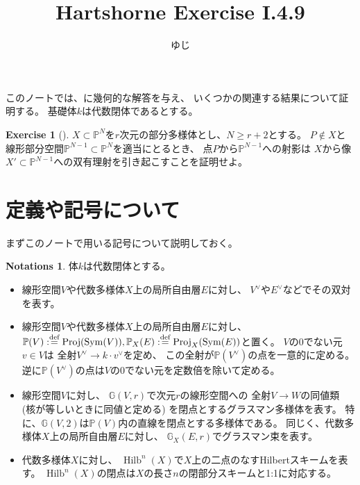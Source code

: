 \documentclass[uplatex]{jsarticle}
\title{Hartshorne Exercise I.4.9}
\author{ゆじ}
\theoremstyle{definition}
\newtheorem*{notation*}{Notations}
\newtheorem*{Ex*}{Exercise}
\DeclareMathOperator{\Proj}{\mathrm{Proj}}
\DeclareMathOperator{\Sym}{\mathrm{Sym}}
\DeclareMathOperator{\Hilb}{\mathrm{Hilb}}
\newcommand{\G}{\mathbb{G}}
\renewcommand{\P}{\mathbb{P}}
\def\dfn{:\overset{\mbox{{\scriptsize def}}}{=}}
\begin{document}
\maketitle


このノートでは、\cite[演習 I.4.9]{Ha}に幾何的な解答を与え、
いくつかの関連する結果について証明する。
基礎体\(k\)は代数閉体であるとする。


\begin{Ex*}[{\cite[演習 I.4.9]{Ha}}]
  \(X\subset \P^N\)を\(r\)次元の部分多様体とし、\(N\geq r+2\)とする。
  \(P\not\in X\)と線形部分空間\(\P^{N-1}\subset \P^N\)を適当にとるとき、
  点\(P\)から\(\P^{N-1}\)への射影は
  \(X\)から像\(X'\subset \P^{N-1}\)への双有理射を引き起こすことを証明せよ。
\end{Ex*}


\section{定義や記号について}



まずこのノートで用いる記号について説明しておく。

\begin{notation*}
  体\(k\)は代数閉体とする。
  \begin{itemize}
    \item
    線形空間\(V\)や代数多様体\(X\)上の局所自由層\(E\)に対し、
    \(V^{\vee}\)や\(E^{\vee}\)などでその双対を表す。
    \item
    線形空間\(V\)や代数多様体\(X\)上の局所自由層\(E\)に対し、
    \(\P(V)\dfn \Proj(\Sym(V)) , \P_X(E)\dfn \Proj_X(\Sym(E))\)と置く。
    \(V\)の\(0\)でない元\(v\in V\)は
    全射\(V^{\vee}\to k\cdot v^{\vee}\)を定め、
    この全射が\(\P(V^{\vee})\)の点を一意的に定める。
    逆に\(\P(V^{\vee})\)の点は\(V\)の\(0\)でない元を定数倍を除いて定める。
    \item
    線形空間\(V\)に対し、
    \(\G(V,r)\)で次元\(r\)の線形空間への
    全射\(V\to W\)の同値類 (核が等しいときに同値と定める)
    を閉点とするグラスマン多様体を表す。
    特に、\(\G(V,2)\)は\(\P(V)\)内の直線を閉点とする多様体である。
    同じく、代数多様体\(X\)上の局所自由層\(E\)に対し、
    \(\G_X(E,r)\)でグラスマン束を表す。
    \item
    代数多様体\(X\)に対し、
    \(\Hilb^n(X)\)で\(X\)上の二点のなすHilbertスキームを表す。
    \(\Hilb^n(X)\)の閉点は\(X\)の長さ\(n\)の閉部分スキームと1:1に対応する。
  \end{itemize}
\end{notation*}
\end{document}

